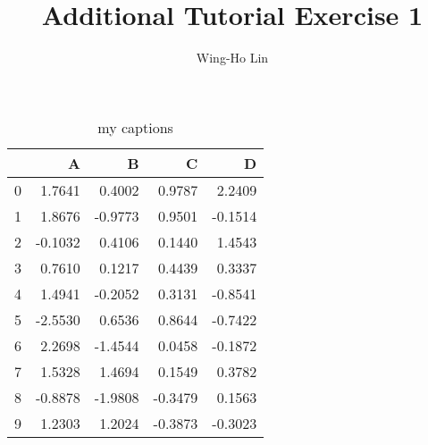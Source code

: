 \documentclass[10pt, oneside]{article}
\title{Additional Tutorial Exercise 1}
\author{Wing-Ho Lin}
\date{}
\begin{document}
    \maketitle 
    \begin{table}
        \centering
        \caption{my captions}
        \begin{tabular}{lrrrr}
        \toprule
         & A & B & C & D \\
        \midrule
        0 & 1.7641 & 0.4002 & \color{white} {\cellcolor{blue}} \color{white} {\cellcolor{blue}} \color{white} {\cellcolor{blue}} \color{white} {\cellcolor{blue}} \color{white} {\cellcolor{blue}} \color{white} {\cellcolor{blue}} 0.9787 & \color{white} {\cellcolor{blue}} \color{white} {\cellcolor{blue}} \color{white} {\cellcolor{blue}} \color{white} {\cellcolor{blue}} \color{white} {\cellcolor{blue}} \color{white} {\cellcolor{blue}} 2.2409 \\
        1 & 1.8676 & \color{red} -0.9773 & 0.9501 & \color{red} -0.1514 \\
        2 & \color{red} -0.1032 & 0.4106 & 0.1440 & 1.4543 \\
        3 & 0.7610 & 0.1217 & 0.4439 & 0.3337 \\
        4 & 1.4941 & \color{red} -0.2052 & 0.3131 & \color{red} -0.8541 \\
        5 & \color{red} -2.5530 & 0.6536 & 0.8644 & \color{red} -0.7422 \\
        6 & \color{white} {\cellcolor{blue}} \color{white} {\cellcolor{blue}} \color{white} {\cellcolor{blue}} \color{white} {\cellcolor{blue}} \color{white} {\cellcolor{blue}} \color{white} {\cellcolor{blue}} 2.2698 & \color{red} -1.4544 & 0.0458 & \color{red} -0.1872 \\
        7 & 1.5328 & \color{white} {\cellcolor{blue}} \color{white} {\cellcolor{blue}} \color{white} {\cellcolor{blue}} \color{white} {\cellcolor{blue}} \color{white} {\cellcolor{blue}} \color{white} {\cellcolor{blue}} 1.4694 & 0.1549 & 0.3782 \\
        8 & \color{red} -0.8878 & \color{red} -1.9808 & \color{red} -0.3479 & 0.1563 \\
        9 & 1.2303 & 1.2024 & \color{red} -0.3873 & \color{red} -0.3023 \\
        \bottomrule
        \end{tabular}
        \end{table}
\end{document}
